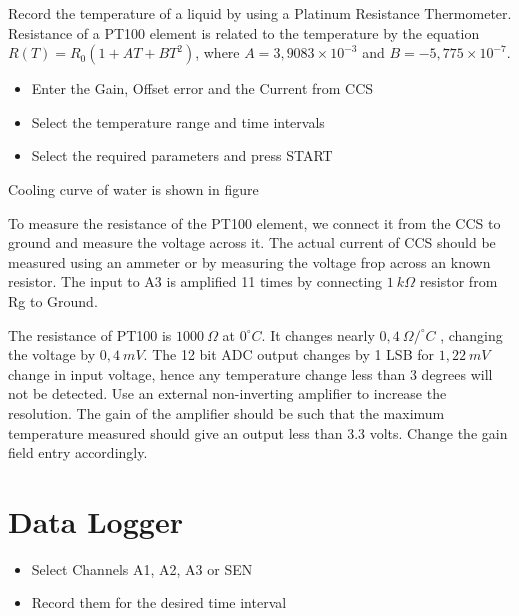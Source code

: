 \documentclass[a4paper,12pt,english]{sphinxmanual}
\let\sphinxpxdimen\pdfpxdimen\else\newdimen\sphinxpxdimen
\begin{document}
Record the temperature of a liquid by using a Platinum Resistance
Thermometer. Resistance of a PT100 element is related to the temperature
by the equation \(R(T) = R_0 (1 + AT + BT^2)\), where
\(A = 3,9083 \times 10^{-3}\) and \(B =  - 5,775 \times 10^{-7}\).

\noindent\sphinxincludegraphics[width=300\sphinxpxdimen]{{pt100}.pdf}
\noindent\sphinxincludegraphics[width=300\sphinxpxdimen]{{pt100-screen}.pdf}

\begin{itemize}
\item {} 
Enter the Gain, Offset error and the Current from CCS

\item {} 
Select the temperature range and time intervals

\item {} 
Select the required parameters and press START

\end{itemize}


Cooling curve of water is shown in figure

To measure the resistance of the PT100 element, we connect it from the
CCS to ground and measure the voltage across it. The actual current of
CCS should be measured using an ammeter or by measuring the voltage frop
across an known resistor. The input to A3 is amplified 11 times by
connecting \(1~k\Omega\) resistor from Rg to Ground.

The resistance of PT100 is \(1000~\Omega\) at \(0^\circ C\). It changes nearly \(0,4~\Omega /^\circ C\)
, changing the voltage by \(0, 4~mV\). The 12 bit ADC output changes
by 1 LSB for \(1,22~mV\) change in input voltage, hence any temperature
change less than 3 degrees will not be detected. Use an external
non-inverting amplifier to increase the resolution. The gain of the
amplifier should be such that the maximum temperature measured should
give an output less than 3.3 volts. Change the gain field entry
accordingly.


\section{Data Logger}
\label{\detokenize{7.2:data-logger}}\label{\detokenize{7.2::doc}}\begin{itemize}
\item {} 
Select Channels A1, A2, A3 or SEN

\item {} 
Record them for the desired time interval

\end{itemize}
\end{document}
